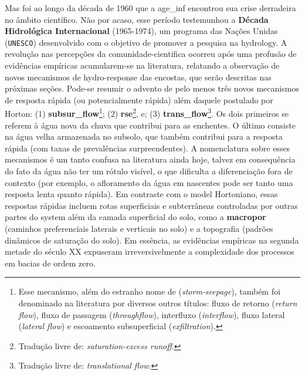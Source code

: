 \documentclass[./main.tex]{subfiles}
\begin{document}
\par Mas foi ao longo da década de 1960 que a \gls{age_inf} encontrou sua crise derradeira no âmbito científico. Não por acaso, esse período testemunhou a \textbf{Década Hidrológica Internacional} (1965-1974), um programa das Nações Unidas (\texttt{UNESCO}) desenvolvido com o objetivo de promover a pesquisa na \gls{hydrology}. A revolução nas percepções da \gls{comunidade-cientifica} ocorreu após uma profusão de evidências empíricas acumularem-se na literatura, relatando a observação de novos mecanismos de \gls{hydro-response} das encostas, que serão descritas nas próximas seções. Pode-se resumir o advento de pelo menos três novos mecanismos de resposta rápida (ou potencialmente rápida) além daquele postulado por Horton: (1) \textbf{\gls{subsur_flow}}\footnote{Esse mecanismo, além do estranho nome de  (\textit{storm-seepage}), também foi denominado na literatura por diversos outros títulos: fluxo de retorno (\textit{return flow}), fluxo de passagem (\textit{throughflow}), interfluxo (\textit{interflow}), fluxo lateral (\textit{lateral flow}) e escoamento subsuperficial (\textit{exfiltration}).}; (2) \textbf{\gls{rse}}\footnote{Tradução livre de: \textit{saturation-excess runoff}.}, e; (3) \textbf{\gls{trans_flow}}\footnote{Tradução livre de: \textit{translational flow}.}. Os dois primeiros se referem à água nova da chuva que contribui para as enchentes. O último consiste na água velha armazenada no subsolo, que também contribui para a resposta rápida (com taxas de prevalências surpreendentes). A nomenclatura sobre esses mecanismos é um tanto confusa na literatura ainda hoje, talvez em consequência do fato da água não ter um rótulo visível, o que dificulta a diferenciação fora de contexto (por exemplo, o afloramento da água em nascentes pode ser tanto uma resposta lenta quanto rápida). Em contraste com o \gls{model} Hortoniano, essas respostas rápidas incluem rotas superficiais e subterrâneas controladas por outras partes do \gls{system} além da camada superficial do solo, como a \textbf{\gls{macropor}} (caminhos preferenciais laterais e verticais no solo) e a topografia (padrões dinâmicos de saturação do solo). Em essência, as evidências empíricas na segunda metade do século XX expuseram irreversivelmente a complexidade dos processos em bacias de ordem zero. 
\end{document}

